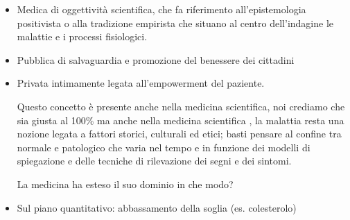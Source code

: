 \documentclass[]{article}
\begin{document}
\begin{itemize}
\item
  Medica di oggettività scientifica, che fa riferimento
  all'epistemologia positivista o alla tradizione empirista che situano
  al centro dell'indagine le malattie e i processi fisiologici.
\end{itemize}

\begin{itemize}
\item
  Pubblica di salvaguardia e promozione del benessere dei cittadini
\item
  Privata intimamente legata all'empowerment del paziente.

  Questo concetto è presente anche nella medicina scientifica, noi
  crediamo che sia giusta al 100\% ma anche nella medicina scientifica ,
  la malattia resta una nozione legata a fattori storici, culturali ed
  etici; basti pensare al confine tra normale e patologico che varia nel
  tempo e in funzione dei modelli di spiegazione e delle tecniche di
  rilevazione dei segni e dei sintomi.

  La medicina ha esteso il suo dominio in che modo?
\end{itemize}

\begin{itemize}
\item
  Sul piano quantitativo: abbassamento della soglia (es. colesterolo)
\end{itemize}
\end{document}
